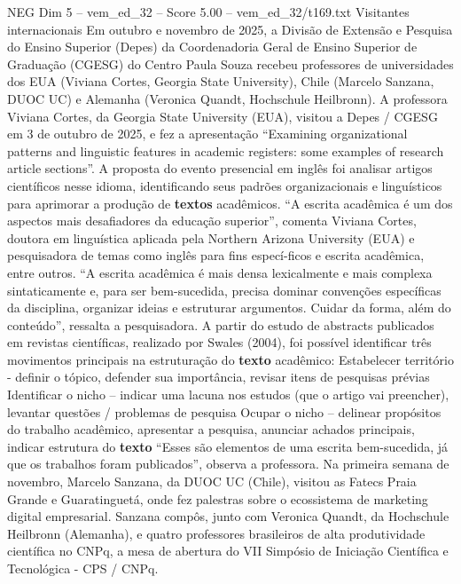 \begin{textsample}{NEG Dim 5 – vem\_ed\_32 – Score 5.00 – vem\_ed\_32/t169.txt}  \label{ex:f5_neg_146}
Visitantes internacionais Em outubro e novembro de 2025, a Divisão de Extensão e Pesquisa do Ensino Superior (Depes) da Coordenadoria Geral de Ensino Superior de Graduação (CGESG) do Centro Paula Souza recebeu professores de universidades dos EUA (Viviana Cortes, Georgia State University), Chile (Marcelo Sanzana, DUOC UC) e Alemanha (Veronica Quandt, Hochschule Heilbronn).
A professora Viviana Cortes, da Georgia State University (EUA), visitou a Depes / CGESG em 3 de outubro de 2025, e fez a apresentação “Examining organizational patterns and linguistic features in academic registers: some examples of research article sections”.
A proposta do evento presencial em inglês foi analisar artigos científicos nesse idioma, identificando seus padrões organizacionais e linguísticos para aprimorar a produção de \textbf{textos} acadêmicos. “A escrita acadêmica é um dos aspectos mais desafiadores da educação superior”, comenta Viviana Cortes, doutora em linguística aplicada pela Northern Arizona University (EUA) e pesquisadora de temas como inglês para fins especí-ficos e escrita acadêmica, entre outros. “A escrita acadêmica é mais densa lexicalmente e mais complexa sintaticamente e, para ser bem-sucedida, precisa dominar convenções específicas da disciplina, organizar ideias e estruturar argumentos.
Cuidar da forma, além do conteúdo”, ressalta a pesquisadora.
A partir do estudo de abstracts publicados em revistas científicas, realizado por Swales (2004), foi possível identificar três movimentos principais na estruturação do \textbf{texto} acadêmico: Estabelecer território - definir o tópico, defender sua importância, revisar itens de pesquisas prévias Identificar o nicho – indicar uma lacuna nos estudos (que o artigo vai preencher), levantar questões / problemas de pesquisa Ocupar o nicho – delinear propósitos do trabalho acadêmico, apresentar a pesquisa, anunciar achados principais, indicar estrutura do \textbf{texto} “Esses são elementos de uma escrita bem-sucedida, já que os trabalhos foram publicados”, observa a professora.
Na primeira semana de novembro, Marcelo Sanzana, da DUOC UC (Chile), visitou as Fatecs Praia Grande e Guaratinguetá, onde fez palestras sobre o ecossistema de marketing digital empresarial.
Sanzana compôs, junto com Veronica Quandt, da Hochschule Heilbronn (Alemanha), e quatro professores brasileiros de alta produtividade científica no CNPq, a mesa de abertura do VII Simpósio de Iniciação Científica e Tecnológica - CPS / CNPq.

\end{textsample}
